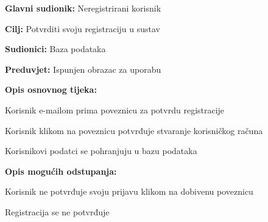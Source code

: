 				\noindent {}
				\begin{packed_item}
					
					\item \textbf{Glavni sudionik: }Neregistrirani korisnik
					\item  \textbf{Cilj:} Potvrditi svoju registraciju u sustav
					\item  \textbf{Sudionici:} Baza podataka
					\item  \textbf{Preduvjet:} Ispunjen obrazac za uporabu
					\item  \textbf{Opis osnovnog tijeka:}
					
					\item[] \begin{packed_enum}
						
						\item Korisnik e-mailom prima poveznicu za potvrdu registracije
						\item Korisnik klikom na poveznicu potvrđuje stvaranje korisničkog računa
						\item Korisnikovi podatci se pohranjuju u bazu podataka
					
					\end{packed_enum}
					
					\item  \textbf{Opis mogućih odstupanja:}
					
					\item[] \begin{packed_item}
						
						\item[2.a] Korisnik ne potvrđuje svoju prijavu klikom na dobivenu poveznicu
						
						\item[] \begin{packed_enum}
							
							\item Registracija se ne potvrđuje\newline
							
						\end{packed_enum}
					\end{packed_item}
				\end{packed_item}
				
